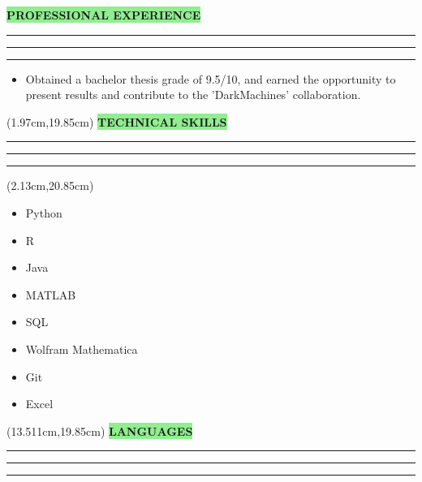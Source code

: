 \documentclass{resume}
\renewenvironment{rSection}[1]{
\sectionskip
\vspace{-3.5pt}
\colorbox{lightGreen}{\hspace{-3pt}\MakeUppercase{\large{\textbf{#1}}}}
\vspace{3pt}
\hrule
\hrule
\hrule
\begin{list}{}{
\setlength{\leftmargin}{1.5em}
}
\item[]
}{
\end{list}
}
\begin{document}
\begin{rSection}{Professional Experience}
\begin{adjustwidth}{-6.5mm}{0pt}
\begin{itemize}
    \item Obtained a bachelor thesis grade of 9.5/10, and earned the opportunity to present results and contribute to the 'DarkMachines' collaboration.
    
\end{itemize}
\end{adjustwidth}

\end{rSection}

\begin{textblock*}{9.8cm}(1.97cm,19.85cm)
\begin{rSection}{Technical Skills}
\end{rSection}
\end{textblock*}

\begin{textblock*}{9.5cm}(2.13cm,20.85cm)
\begin{adjustwidth}{-2mm}{0pt}
\begin{multicols}{2}
\begin{itemize}\setlength\itemsep{-1.5pt}
    \item Python
    \item R
    \item Java
    \item MATLAB
    \columnbreak
    \item SQL
    \item Wolfram Mathematica
    \item Git
    \item Excel
\end{itemize}
\end{multicols}
\end{adjustwidth}
\end{textblock*}

\begin{textblock*}{7.42cm}(13.511cm,19.85cm)
\begin{rSection}{Languages}
\end{rSection}
\end{textblock*}
\end{document}
